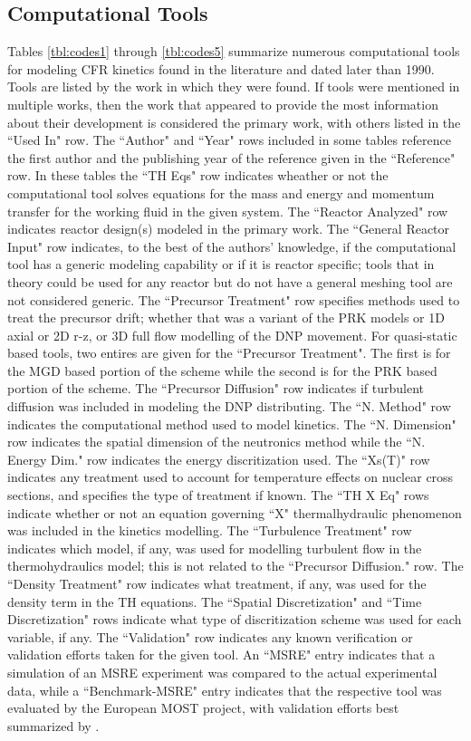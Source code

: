 \documentclass[review]{elsarticle}
\begin{document}
\begin{appendices}

\section{Computational Tools} \label{app:tools}
Tables \ref{tbl:codes1} through \ref{tbl:codes5}
 summarize numerous computational
tools for modeling CFR kinetics 
found in the literature and dated later than 1990. Tools are listed by the
work in which they were found. If tools were mentioned in multiple works, then
the work that appeared to provide the most information about their development
is considered
the primary work, with others listed in the ``Used In" row. The ``Author" and ``Year"
rows included in some tables reference the first author and the publishing year
of the reference given in the ``Reference" row. In these tables the ``TH Eqs"
row indicates wheather or not the computational tool solves
equations for the mass and energy and momentum transfer for the working fluid in
the given system. The
``Reactor Analyzed" row indicates reactor design(s) modeled in
the primary work. The ``General Reactor Input" row indicates, to the best
of the authors' knowledge, if the computational tool has a generic modeling
capability or if it is reactor specific; tools that in theory could be used for
any reactor but do not have a general meshing tool are not considered generic.
The ``Precursor Treatment" row specifies methods used to
treat the precursor drift; whether that was a variant of the PRK models
or 1D axial or 2D r-z, or 3D full flow modelling of the DNP movement. For
quasi-static based tools, two entires are given for the ``Precursor Treatment".
The first is for the MGD based portion of the scheme while the second is for the
PRK based portion of the scheme.
The ``Precursor Diffusion" row indicates if turbulent diffusion was included in
modeling the DNP distributing.
The ``N. Method" row indicates the computational method used to model
kinetics. The ``N. Dimension" row indicates the spatial dimension of 
the neutronics method while the ``N. Energy Dim." row indicates the energy
discritization used.
The ``Xs(T)" row indicates any treatment used to account for temperature
effects on nuclear cross sections, and specifies the type of treatment if known.
The ``TH X Eq" rows indicate whether or not an equation governing ``X" thermalhydraulic
phenomenon was
included in the kinetics modelling.
The ``Turbulence Treatment" row 
indicates which model, if any, was used for modelling turbulent flow in the
thermohydraulics model; this is not related to the ``Precursor Diffusion." row.
The ``Density Treatment" row indicates what treatment, if any, was used for the
density term in the TH equations. The ``Spatial Discretization" and ``Time
Discretization" rows indicate what type of discritization scheme was
used for each variable, if any. The ``Validation" row indicates any known
verification
or validation efforts taken for the given tool. An ``MSRE" entry indicates
that a simulation of an MSRE experiment was compared to the actual experimental
data, while a ``Benchmark-MSRE" entry indicates that the respective tool was
evaluated by the European MOST project, with validation efforts best
summarized by \cite{delpech_benchmark_2003}.


\end{appendices}
\end{document}
